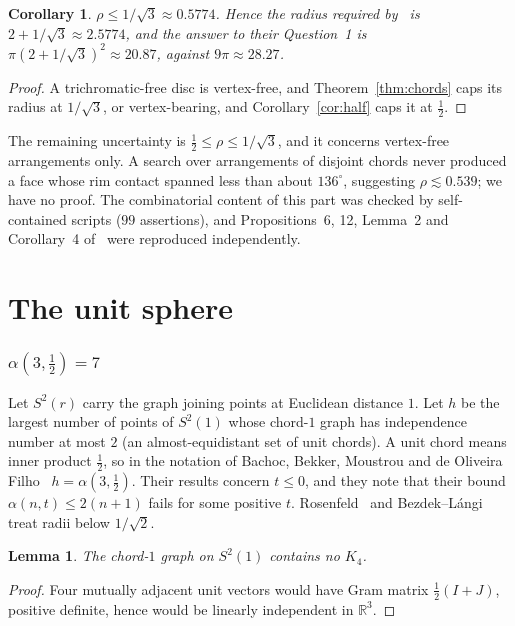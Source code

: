 \documentclass[11pt,a4paper]{amsart}
\newtheorem{lemma}[theorem]{Lemma}
\newtheorem{corollary}[theorem]{Corollary}
\theoremstyle{remark}
\newcommand{\R}{\mathbb{R}}
\begin{document}
\begin{corollary}\label{cor:rho}
$\rho\le1/\sqrt3\approx0.5774$. Hence the radius required by~\cite{SV26} is $2+1/\sqrt3\approx2.5774$, and the answer to their Question~1 is $\pi(2+1/\sqrt3)^2\approx20.87$, against $9\pi\approx28.27$.
\end{corollary}
\begin{proof}
A trichromatic-free disc is vertex-free, and Theorem~\ref{thm:chords} caps its radius at $1/\sqrt3$, or vertex-bearing, and Corollary~\ref{cor:half} caps it at $\tfrac12$.
\end{proof}

The remaining uncertainty is $\tfrac12\le\rho\le1/\sqrt3$, and it concerns vertex-free arrangements only. A search over arrangements of disjoint chords never produced a face whose rim contact spanned less than about $136^\circ$, suggesting $\rho\lesssim0.539$; we have no proof. The combinatorial content of this part was checked by self-contained scripts ($99$ assertions), and Propositions~6, 12, Lemma~2 and Corollary~4 of~\cite{SV26} were reproduced independently.

\part{The unit sphere}

\section{\texorpdfstring{$\alpha(3,\tfrac12)=7$}{alpha(3,1/2)=7}}\label{sec:sphere}

Let $S^2(r)$ carry the graph joining points at Euclidean distance $1$. Let $h$ be the largest number of points of $S^2(1)$ whose chord-$1$ graph has independence number at most $2$ (an almost-equidistant set of unit chords). A unit chord means inner product $\tfrac12$, so in the notation of Bachoc, Bekker, Moustrou and de Oliveira Filho~\cite{BBMO25} $h=\alpha(3,\tfrac12)$. Their results concern $t\le0$, and they note that their bound $\alpha(n,t)\le2(n+1)$ fails for some positive $t$. Rosenfeld~\cite{Ro91} and Bezdek--L\'angi~\cite{BL99} treat radii below $1/\sqrt2$.

\begin{lemma}\label{lem:K4free}
The chord-$1$ graph on $S^2(1)$ contains no $K_4$.
\end{lemma}
\begin{proof}
Four mutually adjacent unit vectors would have Gram matrix $\tfrac12(I+J)$, positive definite, hence would be linearly independent in $\R^3$.
\end{proof}
\end{document}
